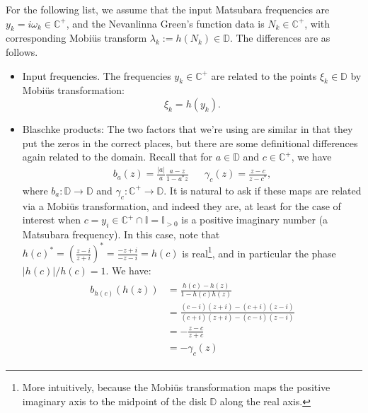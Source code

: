 For the following list, we assume that the input Matsubara frequencies are $y_k = i\omega_k\in \mathbb C^+$, and the Nevanlinna Green's function data is $N_k\in\mathbb C^+$, with corresponding Mobi\"us transform $\lambda_k := h(N_k) \in\mathbb D$. The differences are as follows. 
\begin{itemize}
    \item Input frequencies. The frequencies $y_k\in\mathbb C^+$ are related to the points $\xi_k\in\mathbb D$ by Mobi\"us transformation:
    \begin{equation}
        \xi_k = h(y_k).
    \end{equation}
    \item Blaschke products: The two factors that we're using are similar in that they put the zeros in the correct places, but there are some definitional differences again related to the domain. Recall that for $a\in\mathbb D$ and $c\in\mathbb C^+$, we have
    \begin{align}
        b_a(z) = \frac{|a|}{a}\frac{a - z}{1 - a^* z} && \gamma_c(z) = \frac{z - c}{z - c^*},
    \end{align}
    where $b_a : \mathbb D\rightarrow\mathbb D$ and $\gamma_c : \mathbb C^+\rightarrow \mathbb D$. It is natural to ask if these maps are related via a Mobi\"us transformation, and indeed they are, at least for the case of interest when $c = y_i\in\mathbb C^+\cap \mathbb I = \mathbb I_{> 0}$ is a positive imaginary number (a Matsubara frequency). In this case, note that $h(c)^* = (\frac{z - i}{z + i})^* = \frac{-z+i}{-z-i} = h(c)$ is real\footnote{More intuitively, because the Mobi\"us transformation maps the positive imaginary axis to the midpoint of the disk $\mathbb D$ along the real axis.}, and in particular the phase $|h(c)| / h(c) = 1$. We have:
    \begin{align}
        \begin{split}
            b_{h(c)}(h(z)) &= \frac{h(c) - h(z)}{1 - h(c) h(z)} \\
            &= \frac{(c - i)(z + i) - (c + i)(z - i)}{(c + i)(z + i) - (c - i)(z - i)} \\
            &= - \frac{z - c}{z + c} \\
            &= - \gamma_c(z)
        \end{split}
    \end{align}

\end{itemize}
